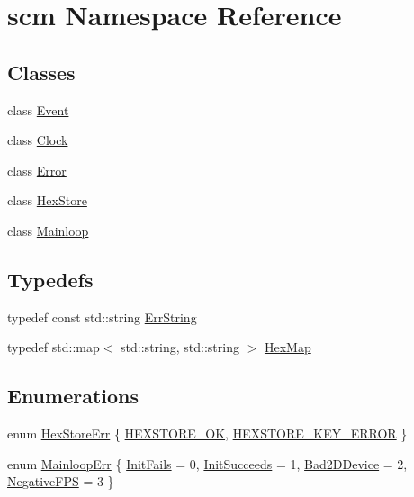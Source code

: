 \hypertarget{namespacescm}{
\section{scm Namespace Reference}
\label{namespacescm}
}
\subsection*{Classes}
\begin{DoxyCompactItemize}
\item 
class \hyperlink{classscm_1_1_event}{Event}
\item 
class \hyperlink{classscm_1_1_clock}{Clock}
\item 
class \hyperlink{classscm_1_1_error}{Error}
\item 
class \hyperlink{classscm_1_1_hex_store}{HexStore}
\item 
class \hyperlink{classscm_1_1_mainloop}{Mainloop}
\end{DoxyCompactItemize}
\subsection*{Typedefs}
\begin{DoxyCompactItemize}
\item 
typedef const std::string \hyperlink{namespacescm_a13a6ecf77ceb7b5b3a38e0fada54aa99}{ErrString}
\item 
typedef std::map$<$ std::string, std::string $>$ \hyperlink{namespacescm_a4d40b517d9d5d1165028e138a05ef06d}{HexMap}
\end{DoxyCompactItemize}
\subsection*{Enumerations}
\begin{DoxyCompactItemize}
\item 
enum \hyperlink{namespacescm_a705760e217d94addc2f8f8102f624d61}{HexStoreErr} \{ \hyperlink{namespacescm_a705760e217d94addc2f8f8102f624d61a646922e14c685ecf838b9a5f8621ef55}{HEXSTORE\_\-OK}, 
\hyperlink{namespacescm_a705760e217d94addc2f8f8102f624d61a723d79af0e48a083e3dd825655a3ddc2}{HEXSTORE\_\-KEY\_\-ERROR}
 \}
\item 
enum \hyperlink{namespacescm_aec9fbdb87d677e6e822d612ed3e3a20b}{MainloopErr} \{ \hyperlink{namespacescm_aec9fbdb87d677e6e822d612ed3e3a20ba91150b31dd282f971b18d0ef72bb638a}{InitFails} =  0, 
\hyperlink{namespacescm_aec9fbdb87d677e6e822d612ed3e3a20bad024311d624d288f051d63b370c3950b}{InitSucceeds} =  1, 
\hyperlink{namespacescm_aec9fbdb87d677e6e822d612ed3e3a20ba570ef772c888e789b7a21cae1c4b6d09}{Bad2DDevice} =  2, 
\hyperlink{namespacescm_aec9fbdb87d677e6e822d612ed3e3a20ba8fcbd9be601bd53af341478a63e75743}{NegativeFPS} =  3
 \}
\end{DoxyCompactItemize}
